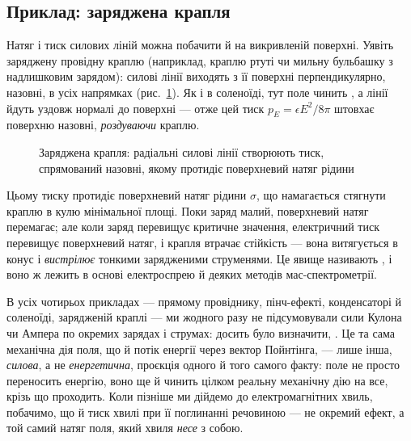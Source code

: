 \documentclass[]{ConspectBook}
\let\enquote\emph
\begin{document}
\subsection*{Приклад: заряджена крапля}

Натяг і тиск силових ліній можна побачити й на викривленій поверхні. Уявіть заряджену провідну краплю (наприклад, краплю ртуті чи мильну
бульбашку з надлишковим зарядом): силові лінії виходять з її поверхні перпендикулярно, назовні, в усіх напрямках (рис.~\ref{pic:ChargedDroplet}).
Як і в соленоїді, тут поле чинить , а лінії йдуть уздовж нормалі до поверхні --- отже цей тиск $p_E=\epsilon E^2/8\pi$
штовхає поверхню назовні, \enquote{роздуваючи} краплю.

\begin{figure}[h!]\centering
	\caption{Заряджена крапля: радіальні силові лінії створюють тиск, спрямований назовні, якому протидіє поверхневий
		натяг рідини\label{pic:ChargedDroplet}}
\end{figure}

Цьому тиску протидіє поверхневий натяг рідини $\sigma$, що намагається стягнути краплю в кулю мінімальної площі. Поки заряд малий, поверхневий
натяг перемагає; але коли заряд перевищує критичне значення, електричний тиск перевищує поверхневий натяг, і крапля втрачає стійкість --- вона
витягується в конус і \enquote{вистрілює} тонкими зарядженими струменями. Це явище називають , і воно ж лежить в основі
електроспрею й деяких методів мас-спектрометрії.

\begin{Attention}
	В усіх чотирьох прикладах --- прямому провіднику, пінч-ефекті, конденсаторі й соленоїді, зарядженій краплі --- ми жодного разу не
	підсумовували сили Кулона чи Ампера по окремих зарядах і струмах: досить було визначити, . Це та сама механічна дія поля, що й потік енергії через вектор Пойнтінга, --- лише інша, \enquote{силова}, а не
	\enquote{енергетична}, проєкція одного й того самого факту: поле не просто переносить енергію, воно ще й чинить цілком реальну механічну дію
	на все, крізь що проходить. Коли пізніше ми дійдемо до електромагнітних хвиль, побачимо, що й тиск хвилі при її поглинанні речовиною --- не
	окремий ефект, а той самий натяг поля, який хвиля \enquote{несе} з собою.
\end{Attention}
\end{document}
